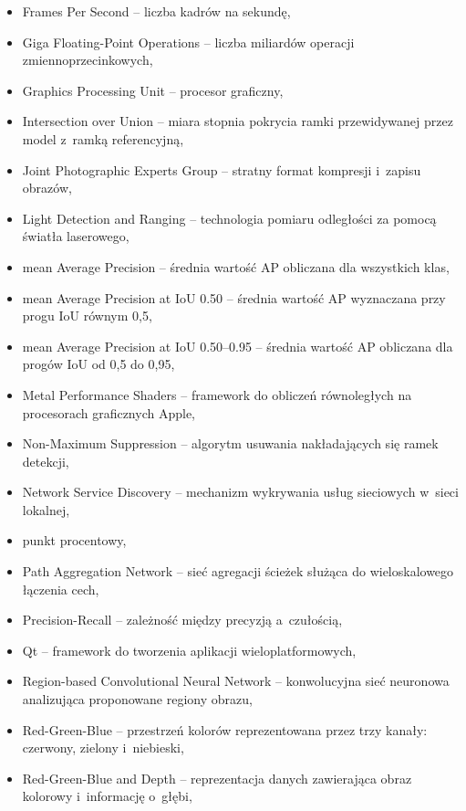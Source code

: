 \begin{itemize}
    \item[FPS] Frames Per Second -- liczba kadrów na sekundę,
    \item[GFLOPs] Giga Floating-Point Operations -- liczba miliardów operacji zmiennoprzecinkowych,
    \item[GPU] Graphics Processing Unit -- procesor graficzny,
    \item[IoU] Intersection over Union -- miara stopnia pokrycia ramki przewidywanej przez model z~ramką referencyjną,
    \item[JPEG] Joint Photographic Experts Group -- stratny format kompresji i~zapisu obrazów,
    \item[LiDAR] Light Detection and Ranging -- technologia pomiaru odległości za pomocą światła laserowego,
    \item[mAP] mean Average Precision -- średnia wartość AP obliczana dla wszystkich klas,
    \item[$mAP50$] mean Average Precision at IoU 0.50 -- średnia wartość AP wyznaczana przy progu IoU równym 0,5,
    \item[$mAP50\text{-}95$] mean Average Precision at IoU 0.50--0.95 -- średnia wartość AP obliczana dla progów IoU od 0,5 do 0,95,
    \item[MPS] Metal Performance Shaders -- framework do obliczeń równoległych na procesorach graficznych Apple,
    \item[NMS] Non-Maximum Suppression -- algorytm usuwania nakładających się ramek detekcji,
    \item[NSD] Network Service Discovery -- mechanizm wykrywania usług sieciowych w~sieci lokalnej,
    \item[p.p.] punkt procentowy,
    \item[PAN] Path Aggregation Network -- sieć agregacji ścieżek służąca do wieloskalowego łączenia cech,
    \item[PR] Precision-Recall -- zależność między precyzją a~czułością,
    \item[Qt] Qt -- framework do tworzenia aplikacji wieloplatformowych,
    \item[R-CNN] Region-based Convolutional Neural Network -- konwolucyjna sieć neuronowa analizująca proponowane regiony obrazu,
    \item[RGB] Red-Green-Blue -- przestrzeń kolorów reprezentowana przez trzy kanały: czerwony, zielony i~niebieski,
    \item[RGB-D] Red-Green-Blue and Depth -- reprezentacja danych zawierająca obraz kolorowy i~informację o~głębi,

\end{itemize}
